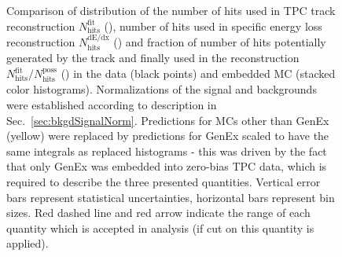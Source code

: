 \begin{figure}[hb]
{\begin{minipage}[t][1.042\linewidth][t]{\linewidth}
    {Comparison of distribution of the number of hits used in TPC track reconstruction $N_{\text{hits}}^{\text{fit}}$ (), number of hits used in specific energy loss reconstruction $N_{\text{hits}}^{\text{dE/dx}}$ () and fraction of number of hits potentially generated by the track and finally used in the reconstruction $N_{\text{hits}}^{\text{fit}}/N_{\text{hits}}^{\text{poss}}$ () in the data (black points) and embedded MC (stacked color histograms). Normalizations of the signal and backgrounds were established according to description in Sec.~\ref{sec:bkgdSignalNorm}. Predictions for MCs other than GenEx (yellow) were replaced by predictions for GenEx scaled to have the same integrals as replaced histograms - this was driven by the fact that only GenEx was embedded into zero-bias TPC data, which is required to describe the three presented quantities. Vertical error bars represent statistical uncertainties, horizontal bars represent bin sizes. Red dashed line and red arrow indicate the range of each quantity which is accepted in analysis (if cut on this quantity is applied).}\label{fig:NHits}
  \end{minipage}
}%

\end{figure}






